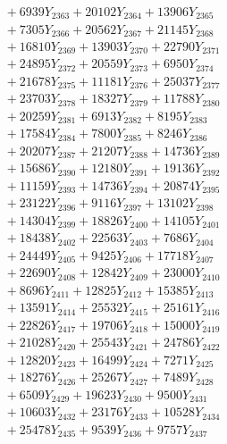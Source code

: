 \documentclass[a4paper,10pt]{article}
\begin{document}
{\begin{align}
&\;  + 6939 Y_{2363} + 20102 Y_{2364} + 13906 Y_{2365} \\[0.3ex]
&\;  + 7305 Y_{2366} + 20562 Y_{2367} + 21145 Y_{2368} \\[0.5ex]\allowbreak
&\;  + 16810 Y_{2369} + 13903 Y_{2370} + 22790 Y_{2371} \\[0.3ex]
&\;  + 24895 Y_{2372} + 20559 Y_{2373} + 6950 Y_{2374} \\[0.3ex]
&\;  + 21678 Y_{2375} + 11181 Y_{2376} + 25037 Y_{2377} \\[0.3ex]
&\;  + 23703 Y_{2378} + 18327 Y_{2379} + 11788 Y_{2380} \\[0.3ex]
&\;  + 20259 Y_{2381} + 6913 Y_{2382} + 8195 Y_{2383} \\[0.3ex]
&\;  + 17584 Y_{2384} + 7800 Y_{2385} + 8246 Y_{2386} \\[0.3ex]
&\;  + 20207 Y_{2387} + 21207 Y_{2388} + 14736 Y_{2389} \\[0.3ex]
&\;  + 15686 Y_{2390} + 12180 Y_{2391} + 19136 Y_{2392} \\[0.3ex]
&\;  + 11159 Y_{2393} + 14736 Y_{2394} + 20874 Y_{2395} \\[0.3ex]
&\;  + 23122 Y_{2396} + 9116 Y_{2397} + 13102 Y_{2398} \\[0.5ex]\allowbreak
&\;  + 14304 Y_{2399} + 18826 Y_{2400} + 14105 Y_{2401} \\[0.3ex]
&\;  + 18438 Y_{2402} + 22563 Y_{2403} + 7686 Y_{2404} \\[0.3ex]
&\;  + 24449 Y_{2405} + 9425 Y_{2406} + 17718 Y_{2407} \\[0.3ex]
&\;  + 22690 Y_{2408} + 12842 Y_{2409} + 23000 Y_{2410} \\[0.3ex]
&\;  + 8696 Y_{2411} + 12825 Y_{2412} + 15385 Y_{2413} \\[0.3ex]
&\;  + 13591 Y_{2414} + 25532 Y_{2415} + 25161 Y_{2416} \\[0.3ex]
&\;  + 22826 Y_{2417} + 19706 Y_{2418} + 15000 Y_{2419} \\[0.3ex]
&\;  + 21028 Y_{2420} + 25543 Y_{2421} + 24786 Y_{2422} \\[0.3ex]
&\;  + 12820 Y_{2423} + 16499 Y_{2424} + 7271 Y_{2425} \\[0.3ex]
&\;  + 18276 Y_{2426} + 25267 Y_{2427} + 7489 Y_{2428} \\[0.5ex]\allowbreak
&\;  + 6509 Y_{2429} + 19623 Y_{2430} + 9500 Y_{2431} \\[0.3ex]
&\;  + 10603 Y_{2432} + 23176 Y_{2433} + 10528 Y_{2434} \\[0.3ex]
&\;  + 25478 Y_{2435} + 9539 Y_{2436} + 9757 Y_{2437} \\[0.3ex]

\end{align}}
\end{document}
